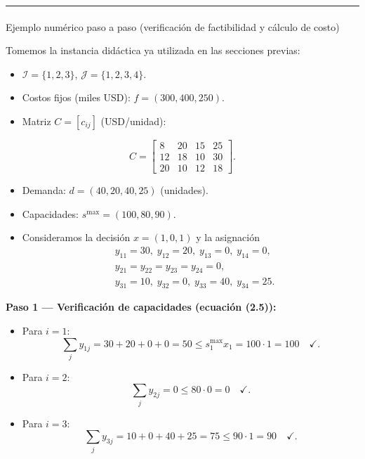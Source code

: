 \documentclass[
  spanish,
  letterpaper,
  DIV=11,
  numbers=noendperiod]{scrartcl}
\makeatletter
\let\oldparagraph\paragraph
\renewcommand{\paragraph}{
    \@ifstar
      \xxxParagraphStar
      \xxxParagraphNoStar
  }
\newcommand{\xxxParagraphStar}[1]{\oldparagraph*{#1}\mbox{}}
\newcommand{\xxxParagraphNoStar}[1]{\oldparagraph{#1}\mbox{}}
\providecommand{\tightlist}{%
  \setlength{\itemsep}{0pt}\setlength{\parskip}{0pt}}
\makeatother
\begin{document}
\begin{center}\rule{0.5\linewidth}{0.5pt}\end{center}

\paragraph{Ejemplo numérico paso a paso (verificación de factibilidad y
cálculo de
costo)}\label{ejemplo-numuxe9rico-paso-a-paso-verificaciuxf3n-de-factibilidad-y-cuxe1lculo-de-costo}

Tomemos la instancia didáctica ya utilizada en las secciones previas:

\begin{itemize}
\tightlist
\item
  \(\mathcal{I}=\{1,2,3\}\), \(\mathcal{J}=\{1,2,3,4\}\).
\item
  Costos fijos (miles USD): \(f=(300,400,250)\).
\item
  Matriz \(C=[c_{ij}]\) (USD/unidad):
\end{itemize}

\[
C=
\begin{bmatrix}
8 & 20 & 15 & 25 \\
12 & 18 & 10 & 30 \\
20 & 10 & 12 & 18
\end{bmatrix}.
\]

\begin{itemize}
\tightlist
\item
  Demanda: \(d=(40,20,40,25)\) (unidades).
\item
  Capacidades: \(s^{\max}=(100,80,90)\).
\item
  Consideramos la decisión \(x=(1,0,1)\) y la asignación \[
  \begin{aligned}
  &y_{11}=30,\; y_{12}=20,\; y_{13}=0,\; y_{14}=0,\\
  &y_{21}=y_{22}=y_{23}=y_{24}=0,\\
  &y_{31}=10,\; y_{32}=0,\; y_{33}=40,\; y_{34}=25.
  \end{aligned}
  \]
\end{itemize}

\textbf{Paso 1 --- Verificación de capacidades (ecuación (2.5)):}

\begin{itemize}
\tightlist
\item
  Para \(i=1\): \[
  \sum_j y_{1j}=30+20+0+0=50 \le s_1^{\max} x_1 = 100\cdot 1 = 100\quad\checkmark.
  \]
\item
  Para \(i=2\): \[
  \sum_j y_{2j}=0 \le 80\cdot 0 = 0\quad\checkmark.
  \]
\item
  Para \(i=3\): \[
  \sum_j y_{3j}=10+0+40+25=75 \le 90\cdot 1 = 90\quad\checkmark.
  \]
\end{itemize}
\end{document}
